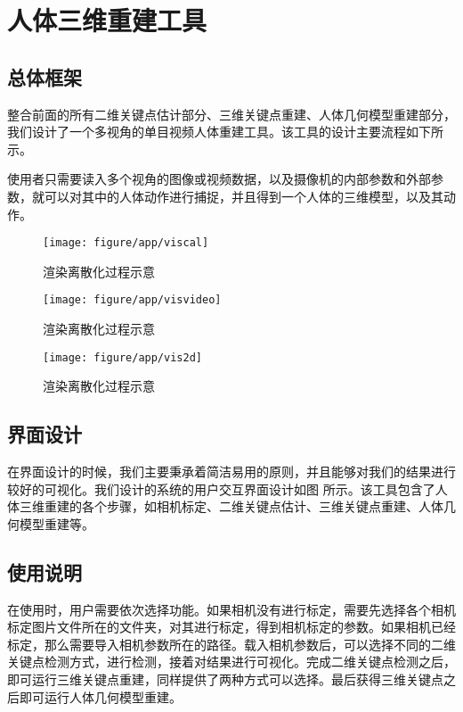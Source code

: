 \section{人体三维重建工具}

\subsection{总体框架}
整合前面的所有二维关键点估计部分、三维关键点重建、人体几何模型重建部分，我们设计了一个多视角的单目视频人体重建工具。该工具的设计主要流程如下所示。

使用者只需要读入多个视角的图像或视频数据，以及摄像机的内部参数和外部参数，就可以对其中的人体动作进行捕捉，并且得到一个人体的三维模型，以及其动作。
\begin{figure}[htbp]
    \centering
    \texttt{[image: figure/app/viscal]}
    \caption{\label{fig:appcal} 渲染离散化过程示意}
\end{figure}

\begin{figure}[htbp]
    \centering
    \texttt{[image: figure/app/visvideo]}
    \caption{\label{fig:appvideo} 渲染离散化过程示意}
\end{figure}

\begin{figure}[htbp]
    \centering
    \texttt{[image: figure/app/vis2d]}
    \caption{\label{fig:app2d} 渲染离散化过程示意}
\end{figure}
 

\subsection{界面设计}
在界面设计的时候，我们主要秉承着简洁易用的原则，并且能够对我们的结果进行较好的可视化。我们设计的系统的用户交互界面设计如图 所示。该工具包含了人体三维重建的各个步骤，如相机标定、二维关键点估计、三维关键点重建、人体几何模型重建等。

\subsection{使用说明}
在使用时，用户需要依次选择功能。如果相机没有进行标定，需要先选择各个相机标定图片文件所在的文件夹，对其进行标定，得到相机标定的参数。如果相机已经标定，那么需要导入相机参数所在的路径。载入相机参数后，可以选择不同的二维关键点检测方式，进行检测，接着对结果进行可视化。完成二维关键点检测之后，即可运行三维关键点重建，同样提供了两种方式可以选择。最后获得三维关键点之后即可运行人体几何模型重建。

